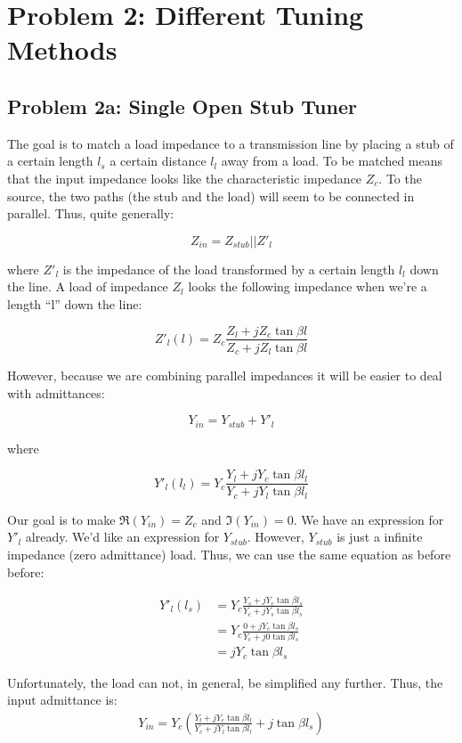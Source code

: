 \section*{Problem 2: Different Tuning Methods}
\addtocounter{section}{1}
\setcounter{equation}{0}
\subsection*{Problem 2a: Single Open Stub Tuner}

The goal is to match a load impedance to a transmission line by placing a stub
of a certain length $l_s$ a certain distance $l_l$ away from a load. To be
matched means that the input impedance looks like the characteristic impedance
$Z_c$. To the source, the two paths (the stub and the load) will seem to be
connected in parallel. Thus, quite generally:

\[ 
        Z_{in} = Z_{stub} || Z'_l
\]

where $Z'_l$ is the impedance of the load transformed by a certain length
$l_{l}$ down the line. A load of impedance $Z_l$ looks the following
impedance when we're a length ``l'' down the line:

\[ 
        Z'_l(l) = Z_c \frac{Z_l + j Z_c \tan \beta l}{Z_c + j Z_l \tan \beta l} 
\]

However, because we are combining parallel impedances it will be easier to deal
with admittances:

\[ 
        Y_{in} = Y_{stub} + Y'_l 
\]

where

\[ 
        Y'_l(l_l) = Y_c \frac{Y_l + j Y_c\tan\beta l_l}{Y_c + j Y_l \tan \beta
        l_l}
\]

Our goal is to make $\Re \left( Y_{in} \right) = Z_c$ and $ \Im \left( Y_{in}
\right) = 0$. We have an expression for $Y'_l$ already. We'd like an expression
for $Y_{stub}$. However, $Y_{stub}$ is just a infinite impedance (zero
admittance) load. Thus, we can use the same equation as before before:

\begin{align*}
    Y'_l(l_s) &= Y_c \frac{Y_s + j Y_c\tan\beta l_s}{Y_c + j Y_s \tan \beta
       l_s}  \\
       &= Y_c \frac{0 + jY_c\tan\beta l_s}{Y_c + j0\tan\beta l_s} \\
       &= j Y_c \tan \beta l_s
\end{align*}

Unfortunately, the load can not, in general, be simplified any further. Thus,
the input admittance is:
\begin{align*}
    Y_{in} = Y_c \left( \frac{Y_l + j Y_c\tan\beta l_l}{Y_c + j Y_l \tan \beta
    l_l} + j \tan \beta l_s \right)
\end{align*}

